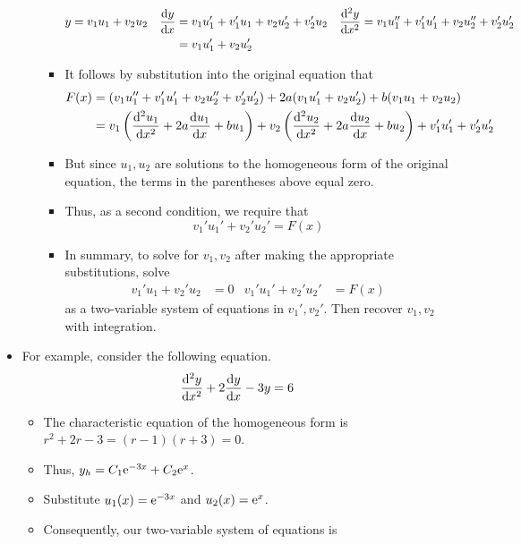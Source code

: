 \documentclass[../main.tex]{subfiles}
\begin{document}
\begin{itemize}
\begin{itemize}
\begin{itemize}
\begin{align*}
                y &= v_1u_1+v_2u_2&
                \dv{y}{x} &= v_1u_1'+v_1'u_1+v_2u_2'+v_2'u_2&
                \dv[2]{y}{x} &= v_1u_1''+v_1'u_1'+v_2u_2''+v_2'u_2'\\
                &&
                &= v_1u_1'+v_2u_2'
            \end{align*}
            \item It follows by substitution into the original equation that
            \begin{align*}
                F(x) &= (v_1u_1''+v_1'u_1'+v_2u_2''+v_2'u_2')+2a(v_1u_1'+v_2u_2')+b(v_1u_1+v_2u_2)\\
                &= v_1\left( \dv[2]{u_1}{x}+2a\dv{u_1}{x}+bu_1 \right)+v_2\left( \dv[2]{u_2}{x}+2a\dv{u_2}{x}+bu_2 \right)+v_1'u_1'+v_2'u_2'
            \end{align*}
            \item But since $u_1,u_2$ are solutions to the homogeneous form of the original equation, the terms in the parentheses above equal zero.
            \item Thus, as a second condition, we require that
            \begin{equation*}
                v_1'u_1'+v_2'u_2' = F(x)
            \end{equation*}
            \item In summary, to solve for $v_1,v_2$ after making the appropriate substitutions, solve
            \begin{align*}
                v_1'u_1+v_2'u_2 &= 0&
                v_1'u_1'+v_2'u_2' &= F(x)
            \end{align*}
            as a two-variable system of equations in $v_1',v_2'$. Then recover $v_1,v_2$ with integration.
        \end{itemize}
    \end{itemize}
    \item For example, consider the following equation.
    \begin{equation*}
        \dv[2]{y}{x}+2\dv{y}{x}-3y = 6
    \end{equation*}
    \begin{itemize}
        \item The characteristic equation of the homogeneous form is $r^2+2r-3=(r-1)(r+3)=0$.
        \item Thus, $y_h=C_1\e[-3x]+C_2\e[x]$.
        \item Substitute $u_1(x)=\e[-3x]$ and $u_2(x)=\e[x]$.
        \item Consequently, our two-variable system of equations is

\end{itemize}
\end{itemize}
\end{document}
